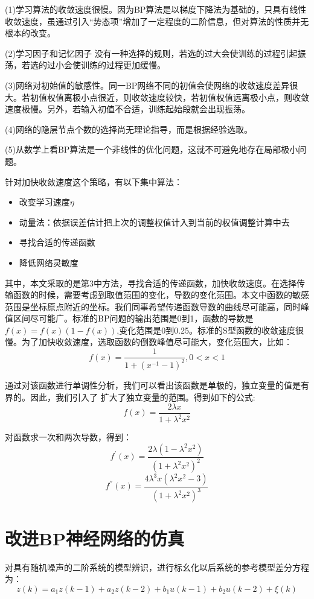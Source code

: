 \documentclass[UTF8]{ctexart}
\begin{document}
(1)学习算法的收敛速度很慢。因为BP算法是以梯度下降法为基础的，只具有线性收敛速度，虽通过引入“势态项”增加了一定程度的二阶信息，但对算法的性质并无根本的改变。

(2)学习因子和记忆因子    没有一种选择的规则，若选的过大会使训练的过程引起振荡，若选的过小会使训练的过程更加缓慢。

(3)网络对初始值的敏感性。同一BP网络不同的初值会使网络的收敛速度差异很大。若初值权值离极小点很近，则收敛速度较快，若初值权值远离极小点，则收敛速度极慢。另外，若输入初值不合适，训练起始段就会出现振荡。

(4)网络的隐层节点个数的选择尚无理论指导，而是根据经验选取。

(5)从数学上看BP算法是一个非线性的优化问题，这就不可避免地存在局部极小问题。

针对加快收敛速度这个策略，有以下集中算法：

\begin{itemize}
\item 改变学习速度$\eta$
\item 动量法：依据误差估计把上次的调整权值计入到当前的权值调整计算中去
\item 寻找合适的传递函数
\item 降低网络灵敏度
\end{itemize}

其中，本文采取的是第3中方法，寻找合适的传递函数，加快收敛速度。在选择传输函数的时候，需要考虑到取值范围的变化，导数的变化范围。本文中函数的敏感范围是坐标原点附近的坐标。我们同事希望传递函数导数的曲线尽可能高，同时峰值区间尽可能广。标准的BP问题的输出范围是0到1，函数的导数是$ f(x)=f(x)(1-f(x)) $,变化范围是0到0.25。标准的S型函数的收敛速度很慢。为了加快收敛速度，选取函数的倒数峰值尽可能大，变化范围大，比如：
$$ f(x)=\frac{1}{1+(x^{-1}-1)^2},0<x<1 $$

通过对该函数进行单调性分析，我们可以看出该函数是单极的，独立变量的值是有界的。因此，我们引入了 扩大了独立变量的范围。得到如下的公式:
$$ f(x)=\frac{2\lambda x}{1+\lambda^2x^2} $$

对函数求一次和两次导数，得到：
$$ f^{'}(x)=\frac{2\lambda(1-\lambda^2x^2)}{(1+\lambda^2x^2)^2} $$
$$ f^{''}(x)=\frac{4\lambda^3x(\lambda^2x^2-3)}{(1+\lambda^2x^2)^3} $$
\section{改进BP神经网络的仿真}

对具有随机噪声的二阶系统的模型辨识，进行标幺化以后系统的参考模型差分方程为：
$$ z(k)=a_1z(k-1)+a_2z(k-2)+b_1u(k-1)+b_2u(k-2)+\xi(k) $$
\end{document}
